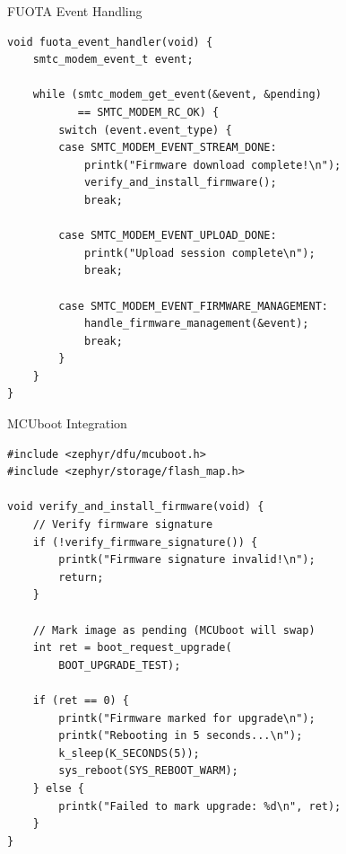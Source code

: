 \documentclass{beamer}
\begin{document}
\begin{frame}[fragile]{FUOTA Event Handling}
\begin{lstlisting}[caption={Handle FUOTA Events}]
void fuota_event_handler(void) {
    smtc_modem_event_t event;

    while (smtc_modem_get_event(&event, &pending)
           == SMTC_MODEM_RC_OK) {
        switch (event.event_type) {
        case SMTC_MODEM_EVENT_STREAM_DONE:
            printk("Firmware download complete!\n");
            verify_and_install_firmware();
            break;

        case SMTC_MODEM_EVENT_UPLOAD_DONE:
            printk("Upload session complete\n");
            break;

        case SMTC_MODEM_EVENT_FIRMWARE_MANAGEMENT:
            handle_firmware_management(&event);
            break;
        }
    }
}
\end{lstlisting}
\end{frame}

\begin{frame}[fragile]{MCUboot Integration}
\begin{lstlisting}[caption={Install Downloaded Firmware}]
#include <zephyr/dfu/mcuboot.h>
#include <zephyr/storage/flash_map.h>

void verify_and_install_firmware(void) {
    // Verify firmware signature
    if (!verify_firmware_signature()) {
        printk("Firmware signature invalid!\n");
        return;
    }

    // Mark image as pending (MCUboot will swap)
    int ret = boot_request_upgrade(
        BOOT_UPGRADE_TEST);

    if (ret == 0) {
        printk("Firmware marked for upgrade\n");
        printk("Rebooting in 5 seconds...\n");
        k_sleep(K_SECONDS(5));
        sys_reboot(SYS_REBOOT_WARM);
    } else {
        printk("Failed to mark upgrade: %d\n", ret);
    }
}
\end{lstlisting}
\end{frame}
\end{document}
